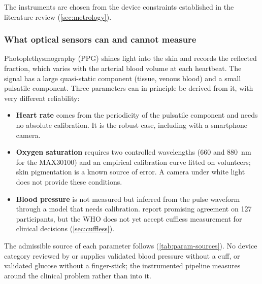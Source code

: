 The instruments are chosen from the device constraints established in the literature review (\cref{sec:metrology}).

\subsubsection{What optical sensors can and cannot measure}\label{sec:hardware}\label{sec:ppg}\label{sec:contradiction}\label{sec:device-landscape}\label{sec:lowcost}

Photoplethysmography (PPG) shines light into the skin and records the reflected fraction, which varies with the arterial blood volume at each heartbeat. The signal has a large quasi-static component (tissue, venous blood) and a small pulsatile component. Three parameters can in principle be derived from it, with very different reliability:
\begin{itemize}[nosep]
  \item \textbf{Heart rate} comes from the periodicity of the pulsatile component and needs no absolute calibration. It is the robust case, including with a smartphone camera.
  \item \textbf{Oxygen saturation} requires two controlled wavelengths (660 and 880~nm for the MAX30100) and an empirical calibration curve fitted on volunteers; skin pigmentation is a known source of error. A camera under white light does not provide these conditions.
  \item \textbf{Blood pressure} is not measured but inferred from the pulse waveform through a model that needs calibration. \Textcite{liu2025ppg} report promising agreement on 127 participants, but the WHO does not yet accept cuffless measurement for clinical decisions (\cref{sec:cuffless}).
\end{itemize}

The admissible source of each parameter follows (\cref{tab:param-sources}). No device category reviewed by \textcite{liu2025review} or \textcite{alhaddad2022} supplies validated blood pressure without a cuff, or validated glucose without a finger-stick; the instrumented pipeline measures around the clinical problem rather than into it.

